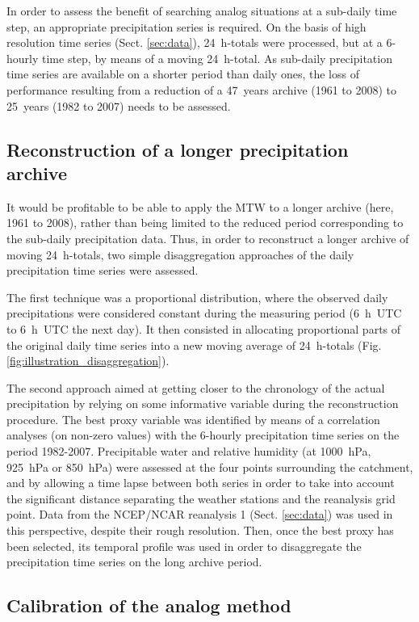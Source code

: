 \documentclass[hess, manuscript]{copernicus}
\begin{document}
In order to assess the benefit of searching analog situations at a sub-daily time step, an appropriate precipitation series is required. On the basis of high resolution time series (Sect. \ref{sec:data}), 24~h-totals were processed, but at a 6-hourly time step, by means of a moving 24~h-total.  As sub-daily precipitation time series are available on a shorter period than daily ones, the loss of performance resulting from a reduction of a 47~years archive (1961 to 2008) to 25~years (1982 to 2007) needs to be assessed.


\subsection{Reconstruction of a longer precipitation archive}
\label{sec:reconstruction}

It would be profitable to be able to apply the MTW to a longer archive (here, 1961 to 2008), rather than being limited to the reduced period corresponding to the sub-daily precipitation data. Thus, in order to reconstruct a longer archive of moving 24~h-totals, two simple disaggregation approaches of the daily precipitation time series were assessed.

The first technique was a proportional distribution, where the observed daily precipitations were considered constant during the measuring period (6~h~UTC to 6~h~UTC the next day). It then consisted in allocating proportional parts of the original daily time series into a new moving average of 24~h-totals (Fig. \ref{fig:illustration_disaggregation}). 

The second approach aimed at getting closer to the chronology of the actual precipitation by relying on some informative variable during the reconstruction procedure. The best proxy variable was identified by means of a correlation analyses (on non-zero values) with the 6-hourly precipitation time series on the period 1982-2007. Precipitable water and relative humidity (at 1000~hPa, 925~hPa or 850~hPa) were assessed at the four points surrounding the catchment, and by allowing a time lapse between both series in order to take into account the significant distance separating the weather stations and the reanalysis grid point. Data from the NCEP/NCAR reanalysis 1 (Sect. \ref{sec:data}) was used in this perspective, despite their rough resolution. Then, once the best proxy has been selected, its temporal profile was used in order to disaggregate the precipitation time series on the long archive period.


\subsection{Calibration of the analog method}
\label{sec:calibration}
\end{document}
